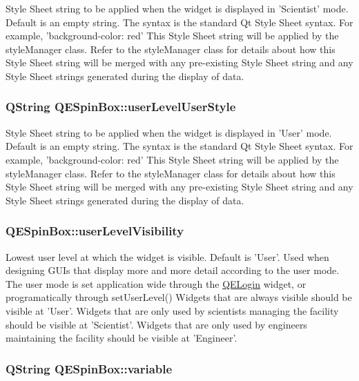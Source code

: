 \label{classQESpinBox_a321df6a5a5d9eab84b1ce3fbe3bc0b9e}
Style Sheet string to be applied when the widget is displayed in 'Scientist' mode. Default is an empty string. The syntax is the standard Qt Style Sheet syntax. For example, 'background-\/color: red' This Style Sheet string will be applied by the styleManager class. Refer to the styleManager class for details about how this Style Sheet string will be merged with any pre-\/existing Style Sheet string and any Style Sheet strings generated during the display of data. \hypertarget{classQESpinBox_aa367951d3e92c1959ce39b04dcf3e4fe}{
\subsubsection[{userLevelUserStyle}]{\setlength{\rightskip}{0pt plus 5cm}QString QESpinBox::userLevelUserStyle}}
\label{classQESpinBox_aa367951d3e92c1959ce39b04dcf3e4fe}
Style Sheet string to be applied when the widget is displayed in 'User' mode. Default is an empty string. The syntax is the standard Qt Style Sheet syntax. For example, 'background-\/color: red' This Style Sheet string will be applied by the styleManager class. Refer to the styleManager class for details about how this Style Sheet string will be merged with any pre-\/existing Style Sheet string and any Style Sheet strings generated during the display of data. \hypertarget{classQESpinBox_a36b8c4b73a3f918f967a45e370d53249}{
\subsubsection[{userLevelVisibility}]{ QESpinBox::userLevelVisibility}}
\label{classQESpinBox_a36b8c4b73a3f918f967a45e370d53249}
Lowest user level at which the widget is visible. Default is 'User'. Used when designing GUIs that display more and more detail according to the user mode. The user mode is set application wide through the \hyperlink{classQELogin}{QELogin} widget, or programatically through setUserLevel() Widgets that are always visible should be visible at 'User'. Widgets that are only used by scientists managing the facility should be visible at 'Scientist'. Widgets that are only used by engineers maintaining the facility should be visible at 'Engineer'. \hypertarget{classQESpinBox_ad3800174538dbb05744842b3f27c609a}{
\subsubsection[{variable}]{\setlength{\rightskip}{0pt plus 5cm}QString QESpinBox::variable}}
